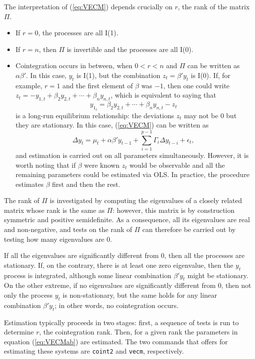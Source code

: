 The interpretation of (\ref{eq:VECM}) depends crucially on $r$, the rank of
the matrix $\Pi$.
\begin{itemize}
\item If $r = 0$, the processes are all I(1).
\item If $r = n$, then $\Pi$ is invertible and the processes are all I(0).
\item Cointegration occurs in between, when $0 < r < n$ and $\Pi$ can
  be written as $\alpha \beta'$. In this case, $y_t$ is I(1), but the
  combination $z_t = \beta'y_t$ is I(0). If, for example, $r=1$ and
  the first element of $\beta$ was $-1$, then one could write $z_t =
  -y_{1,t} + \beta_2 y_{2,t} + \cdots + \beta_n y_{n,t}$, which is
  equivalent to saying that
  \[
    y_{1_t} = \beta_2 y_{2,t} + \cdots + \beta_n y_{n,t} - z_t
  \]
  is a long-run equilibrium relationship: the deviations $z_t$
  may not be 0 but they are stationary. In this case, (\ref{eq:VECM})
  can be written as 
  \begin{equation}
    \label{eq:VECMab}
    \Delta y_t = \mu_t + \alpha \beta' y_{t-1} + \sum_{i=1}^{p-1} \Gamma_i 
    \Delta y_{t-i} + \epsilon_t ,
  \end{equation}
  and estimation is carried out on all parameters
  simultaneously. However, it is worth noting that if $\beta$ were
  known $z_t$ would be observable and all the remaining parameters
  could be estimated via OLS. In practice, the procedure estimates
  $\beta$ first and then the rest.
\end{itemize}

The rank of $\Pi$ is investigated by computing the eigenvalues of a
closely related matrix whose rank is the same as $\Pi$: however, this
matrix is by construction symmetric and positive semidefinite.  As a
consequence, all its eigenvalues are real and non-negative, and tests
on the rank of $\Pi$ can therefore be carried out by testing how many
eigenvalues are 0.

If all the eigenvalues are significantly different from 0, then all
the processes are stationary. If, on the contrary, there is at least
one zero eigenvalue, then the $y_t$ process is integrated, although
some linear combination $\beta'y_t$ might be stationary. On the other
extreme, if no eigenvalues are significantly different from 0, then
not only the process $y_t$ is non-stationary, but the same holds for
any linear combination $\beta'y_t$; in other words, no cointegration
occurs.

Estimation typically proceeds in two stages: first, a sequence of
tests is run to determine $r$, the cointegration rank. Then, for a
given rank the parameters in equation (\ref{eq:VECMab}) are estimated.
The two commands that  offers for estimating these systems
are \texttt{coint2} and \texttt{vecm}, respectively. 

